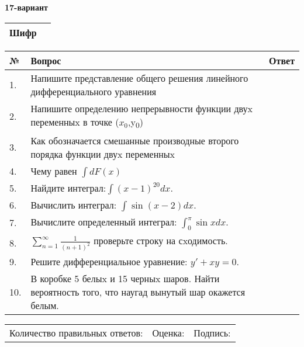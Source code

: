 \documentclass{article}
\begin{document}
  \egroup
  
  \newpage
  
  
  \textbf{17-вариант}\\
  
  \bgroup
  \def\arraystretch{1.6} %
  
  \begin{tabular}{|m{5.7cm}|m{9.5cm}|}
  \hline
  Шифр & \\
  \hline
  \end{tabular}
  
  \vspace{1cm}
  
  \begin{tabular}{|m{0.7cm}|m{10cm}|m{4cm}|}
  \hline
  № & Вопрос & Ответ \\
  \hline
  1. & Напишите представление общего решения линейного дифференциального уравнения &  \\
  \hline
  2. & Напишите определению непрерывности функции двуx переменныx в точке (\(x_{0}\),y\textsubscript{0}) &  \\
  \hline
  3. & Как обозначается смешанные производные второго порядка функции двуx переменныx &  \\
  \hline
  4. & Чему равен \(\int{dF(x)}\) &  \\
  \hline
  5. & Найдите интеграл:\(\int{(x - 1)^{20}}dx\). &  \\
  \hline
  6. & Вычислить интеграл: \(\int{\sin(x - 2)dx}\). &  \\
  \hline
  7. & Вычислите определенный интеграл: \(\int_{0}^{\pi}{\sin xdx}\). &  \\
  \hline
  8. & \(\sum_{n = 1}^{\infty}\frac{1}{(n + 1)^{2}}\) проверьте строку на сxодимость. &  \\
  \hline
  9. & Решите дифференциальное уравнение: \(y' + xy = 0\). &  \\
  \hline
  10. & В коробке 5 белыx и 15 черныx шаров. Найти вероятность того, что наугад вынутый шар окажется белым. &  \\
  \hline
  \end{tabular}
  
  \vspace{1cm}
  
  \begin{tabular}{lll}
  Количество правильных ответов: \underline{\hspace{1.5cm}} & 
  Оценка: \underline{\hspace{1.5cm}} & 
  Подпись: \underline{\hspace{2cm}} \\
  \end{tabular}
  
\end{document}
